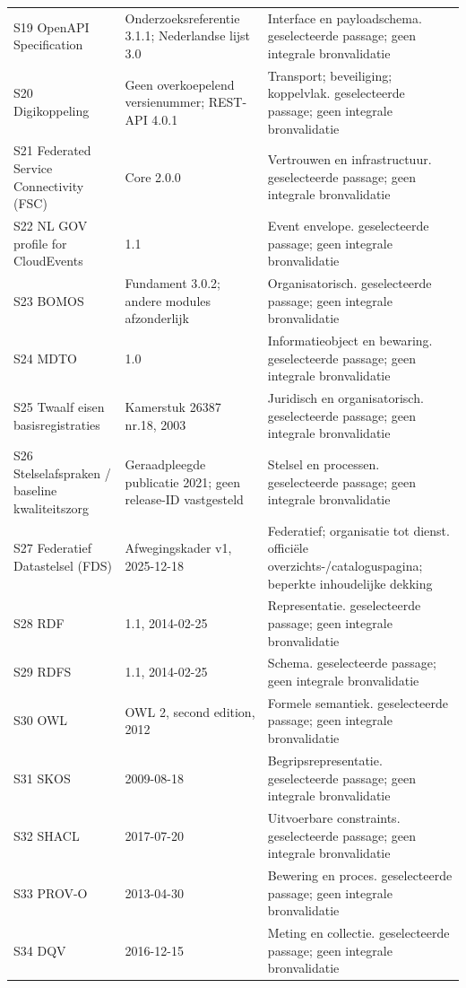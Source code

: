 \begin{longtable}{@{}P{.29\linewidth}P{.22\linewidth}P{.41\linewidth}@{}}
S19 OpenAPI Specification & Onderzoeksreferentie 3.1.1; Nederlandse lijst 3.0 & Interface en payloadschema. geselecteerde passage; geen integrale bronvalidatie \\
S20 Digikoppeling & Geen overkoepelend versienummer; REST-API 4.0.1 & Transport; beveiliging; koppelvlak. geselecteerde passage; geen integrale bronvalidatie \\
S21 Federated Service Connectivity (FSC) & Core 2.0.0 & Vertrouwen en infrastructuur. geselecteerde passage; geen integrale bronvalidatie \\
S22 NL GOV profile for CloudEvents & 1.1 & Event envelope. geselecteerde passage; geen integrale bronvalidatie \\
S23 BOMOS & Fundament 3.0.2; andere modules afzonderlijk & Organisatorisch. geselecteerde passage; geen integrale bronvalidatie \\
S24 MDTO & 1.0 & Informatieobject en bewaring. geselecteerde passage; geen integrale bronvalidatie \\
S25 Twaalf eisen basisregistraties & Kamerstuk 26387 nr.18, 2003 & Juridisch en organisatorisch. geselecteerde passage; geen integrale bronvalidatie \\
S26 Stelselafspraken / baseline kwaliteitszorg & Geraadpleegde publicatie 2021; geen release-ID vastgesteld & Stelsel en processen. geselecteerde passage; geen integrale bronvalidatie \\
S27 Federatief Datastelsel (FDS) & Afwegingskader v1, 2025-12-18 & Federatief; organisatie tot dienst. officiële overzichts-/cataloguspagina; beperkte inhoudelijke dekking \\
S28 RDF & 1.1, 2014-02-25 & Representatie. geselecteerde passage; geen integrale bronvalidatie \\
S29 RDFS & 1.1, 2014-02-25 & Schema. geselecteerde passage; geen integrale bronvalidatie \\
S30 OWL & OWL 2, second edition, 2012 & Formele semantiek. geselecteerde passage; geen integrale bronvalidatie \\
S31 SKOS & 2009-08-18 & Begripsrepresentatie. geselecteerde passage; geen integrale bronvalidatie \\
S32 SHACL & 2017-07-20 & Uitvoerbare constraints. geselecteerde passage; geen integrale bronvalidatie \\
S33 PROV-O & 2013-04-30 & Bewering en proces. geselecteerde passage; geen integrale bronvalidatie \\
S34 DQV & 2016-12-15 & Meting en collectie. geselecteerde passage; geen integrale bronvalidatie \\

\end{longtable}
